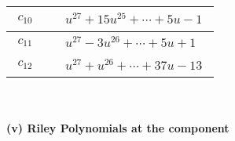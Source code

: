 \documentclass[1p]{elsarticle_modified}
\theoremstyle{definition}
\begin{document}
\begin{tabular}{m{50pt}|m{274pt}}
\hline $$\begin{aligned}c_{10}\end{aligned}$$&$\begin{aligned}
&u^{27}+15 u^{25}+\cdots+5 u-1
\end{aligned}$\\
\hline $$\begin{aligned}c_{11}\end{aligned}$$&$\begin{aligned}
&u^{27}-3 u^{26}+\cdots+5 u+1
\end{aligned}$\\
\hline $$\begin{aligned}c_{12}\end{aligned}$$&$\begin{aligned}
&u^{27}+u^{26}+\cdots+37 u-13
\end{aligned}$\\
\hline
\end{tabular}\\~\\
\newpage\renewcommand{\arraystretch}{1}
\flushleft \textbf{(v) Riley Polynomials at the component}\newline \\
\end{document}
